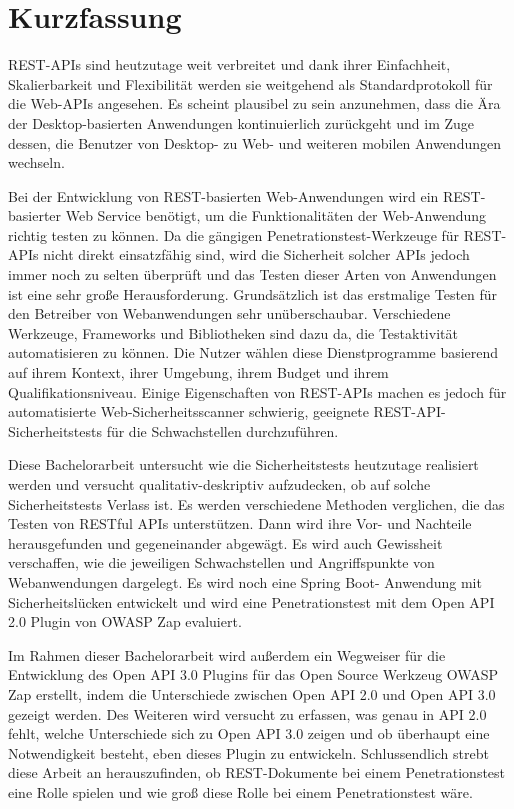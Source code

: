 \chapter{\textbf{Kurzfassung}}

REST-APIs sind heutzutage weit verbreitet und dank ihrer Einfachheit, Skalierbarkeit und Flexibilität werden sie weitgehend als Standardprotokoll für die Web-APIs angesehen. Es scheint plausibel zu sein anzunehmen, dass die Ära der Desktop-basierten Anwendungen kontinuierlich zurückgeht und im Zuge dessen, die Benutzer von Desktop- zu Web- und weiteren mobilen Anwendungen wechseln.

Bei der Entwicklung von REST-basierten Web-Anwendungen wird ein REST-basierter Web Service benötigt, um die Funktionalitäten der Web-Anwendung richtig testen zu können. Da die gängigen Penetrationstest-Werkzeuge für REST-APIs nicht direkt einsatzfähig sind, wird die Sicherheit solcher APIs jedoch immer noch zu selten überprüft und das Testen dieser Arten von Anwendungen ist eine sehr große Herausforderung. Grundsätzlich ist das erstmalige Testen für den Betreiber von Webanwendungen sehr unüberschaubar. Verschiedene Werkzeuge, Frameworks und Bibliotheken sind dazu da, die Testaktivität automatisieren zu können. Die Nutzer wählen diese Dienstprogramme basierend auf ihrem Kontext, ihrer Umgebung, ihrem Budget und ihrem Qualifikationsniveau. Einige Eigenschaften von REST-APIs machen es jedoch für automatisierte Web-Sicherheitsscanner schwierig, geeignete REST-API-Sicherheitstests für die Schwachstellen durchzuführen.

Diese Bachelorarbeit untersucht wie die Sicherheitstests heutzutage realisiert werden und versucht qualitativ-deskriptiv aufzudecken, ob auf solche Sicherheitstests Verlass ist. Es werden verschiedene Methoden verglichen, die das Testen von RESTful APIs unterstützen. Dann wird ihre Vor- und Nachteile herausgefunden und gegeneinander abgewägt. Es wird auch Gewissheit verschaffen, wie die jeweiligen Schwachstellen und Angriffspunkte von Webanwendungen dargelegt. Es wird noch eine Spring Boot- Anwendung mit Sicherheitslücken entwickelt und wird eine Penetrationstest mit dem Open API 2.0 Plugin von OWASP Zap evaluiert.

Im Rahmen dieser Bachelorarbeit wird außerdem ein Wegweiser für die Entwicklung des Open API 3.0 Plugins für das Open Source Werkzeug OWASP Zap erstellt, indem die Unterschiede zwischen Open API 2.0 und Open API 3.0 gezeigt werden. Des Weiteren wird versucht zu erfassen, was genau in API 2.0 fehlt, welche Unterschiede sich zu Open API 3.0 zeigen und ob überhaupt eine Notwendigkeit besteht, eben dieses Plugin zu entwickeln. Schlussendlich strebt diese Arbeit an herauszufinden, ob REST-Dokumente bei einem Penetrationstest eine Rolle spielen und wie groß diese Rolle bei einem Penetrationstest wäre.